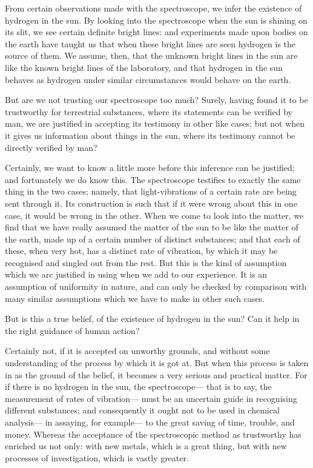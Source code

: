 \documentclass[12pt]{article}
\begin{document}
From certain observations made with the spectroscope, we infer the existence of hydrogen in the sun. By looking into the spectroscope when the sun is shining on its slit, we see certain definite bright lines: and experiments made upon bodies on the earth have taught us that when these bright lines are seen hydrogen is the source of them. We assume, then, that the unknown bright lines in the sun are like the known bright lines of the laboratory, and that hydrogen in the sun behaves as hydrogen under similar circumstances would behave on the earth.

But are we not trusting our spectroscope too much? Surely, having found it to be trustworthy for terrestrial substances, where its statements can be verified by man, we are justified in accepting its testimony in other like cases; but not when it gives us information about things in the sun, where its testimony cannot be directly verified by man?

Certainly, we want to know a little more before this inference can be justified; and fortunately we do know this. The spectroscope testifies to exactly the same thing in the two cases; namely, that light-vibrations of a certain rate are being sent through it. Its construction is such that if it were wrong about this in one case, it would be wrong in the other. When we come to look into the matter, we find that we have really assumed the matter of the sun to be like the matter of the earth, made up of a certain number of distinct substances; and that each of these, when very hot, has a distinct rate of vibration, by which it may be recognised and singled out from the rest. But this is the kind of assumption which we arc justified in using when we add to our experience. It is an assumption of uniformity in nature, and can only be checked by comparison with many similar assumptions which we have to make in other such cases.

But is this a true belief, of the existence of hydrogen in the sun? Can it help in the right guidance of human action?

Certainly not, if it is accepted on unworthy grounds, and without some understanding of the process by which it is got at. But when this process is taken in as the ground of the belief, it becomes a very serious and practical matter. For if there is no hydrogen in the sun, the spectroscope--- that is to say, the measurement of rates of vibration--- must be an uncertain guide in recognising different substances; and consequently it ought not to be used in chemical analysis--- in assaying, for example--- to the great saving of time, trouble, and money. Whereas the acceptance of the spectroscopic method as trustworthy has enriched us not only: with new  metals, which is a great thing, but with new processes of investigation, which is vastly greater.
\end{document}

